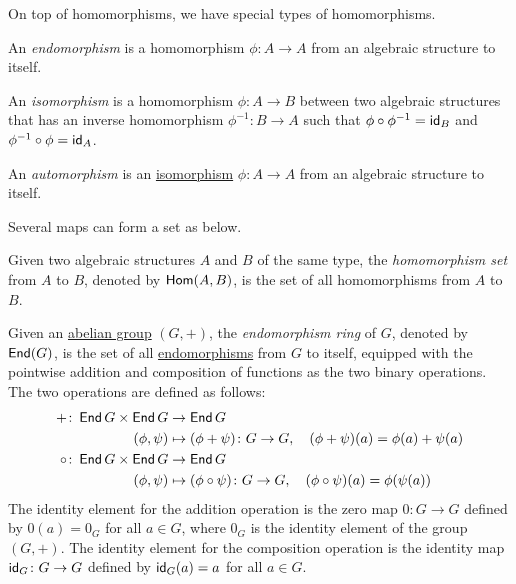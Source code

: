 On top of homomorphisms, we have special types of homomorphisms.

\begin{definition}[Endomorphism]\label{def:endomorphism}
  An \emph{endomorphism} is a homomorphism $\phi \colon A \to A$ from an algebraic structure to itself.
\end{definition}

\begin{definition}[Isomorphisms]\label{def:isomorphism}
  An \emph{isomorphism} is a homomorphism $\phi \colon A \to B$ between two algebraic structures that has an inverse homomorphism $\phi^{-1} \colon B \to A$ such that $\phi \circ \phi^{-1} = \operatorname{\text{\normalfont\sffamily id}}_{B}$ and $\phi^{-1} \circ \phi = \operatorname{\text{\normalfont\sffamily id}}_{A}$.
\end{definition}

\begin{definition}[Automorphism]\label{def:automorphism}
  An \emph{automorphism} is an \hyperref[def:isomorphism]{isomorphism} $\phi \colon A \to A$ from an algebraic structure to itself.
\end{definition}

Several maps can form a set as below.

\begin{definition}\label{def:homomorphism_set}
  Given two algebraic structures $A$ and $B$ of the same type, the \emph{homomorphism set} from $A$ to $B$, denoted by $\operatorname{\text{\normalfont\sffamily Hom}}(A, B)$, is the set of all homomorphisms from $A$ to $B$.
\end{definition}

\begin{definition}\label{def:endomorphism_ring}
  Given an \hyperref[def:abelian_structure]{abelian group} $(G, +)$, the \emph{endomorphism ring} of $G$, denoted by $\operatorname{\text{\normalfont\sffamily End}}(G)$, is the set of all \hyperref[def:endomorphism]{endomorphisms} from $G$ to itself, equipped with the pointwise addition and composition of functions as the two binary operations. The two operations are defined as follows:
  \begin{align*}
    + \colon \operatorname{\text{\normalfont\sffamily End}}{G} \times \operatorname{\text{\normalfont\sffamily End}}{G}     & \to \operatorname{\text{\normalfont\sffamily End}}{G}                                                                     \\
    (\phi, \psi)                   & \mapsto (\phi + \psi) \colon G \to G, \quad (\phi + \psi)(a) = \phi(a) + \psi(a)     \\
    \circ \colon \operatorname{\text{\normalfont\sffamily End}}{G} \times \operatorname{\text{\normalfont\sffamily End}}{G} & \to \operatorname{\text{\normalfont\sffamily End}}{G}                                                                     \\
    (\phi, \psi)                   & \mapsto (\phi \circ \psi) \colon G \to G, \quad (\phi \circ \psi)(a) = \phi(\psi(a))
  \end{align*}
  The identity element for the addition operation is the zero map $0 \colon G \to G$ defined by $0(a) = 0_G$ for all $a \in G$, where $0_G$ is the identity element of the group $(G, +)$. The identity element for the composition operation is the identity map $\operatorname{\text{\normalfont\sffamily id}}_G \colon G \to G$ defined by $\operatorname{\text{\normalfont\sffamily id}}_G(a) = a$ for all $a \in G$.
\end{definition}

